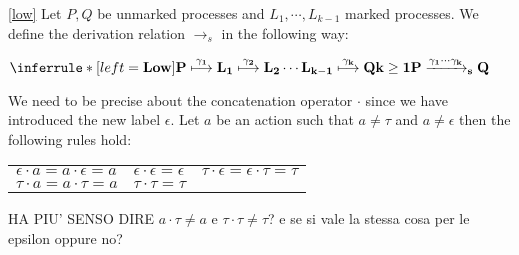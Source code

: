   
\begin{definition}\ref{low}
  Let $P, Q$ be unmarked processes and $L_{1}, \cdots, L_{k-1}$ marked processes. We define the derivation relation $\rightarrow_{s}$ in the following way:
  \begin{center}
    $\inferrule* [left=\bf{Low}]{
	P \stackrel{\gamma_{1}}{\longmapsto} L_{1} \stackrel{\gamma_{2}}{\longmapsto} L_{2} \cdots L_{k-1} \stackrel{\gamma_{k}}{\longmapsto} Q
      \\
	k\geq 1
    }{
      P \xrightarrow{\gamma_{1} \cdots \gamma_{k}}_{s}  Q
    }$
  \end{center}
  We need to be precise about the concatenation operator $\cdot$ since we have introduced the new label $\epsilon$. Let $a$ be an action such that $a\neq \tau$ and $a\neq \epsilon$ then the following rules hold:
  \begin{center}
      \begin{tabular}{lll}
	  $\epsilon \cdot a = a \cdot \epsilon = a$
	&
	  $\epsilon \cdot \epsilon = \epsilon$
	&
	  $\tau \cdot \epsilon = \epsilon \cdot \tau = \tau$
	\\
	  $\tau \cdot a = a \cdot \tau = a$
	&
	  $\tau \cdot \tau = \tau$
	&
      \end{tabular}
  \end{center}

  HA PIU' SENSO DIRE $a \cdot \tau \neq a$ e $\tau \cdot \tau \neq \tau$? e se si vale la stessa cosa per le epsilon oppure no?

\end{definition}



